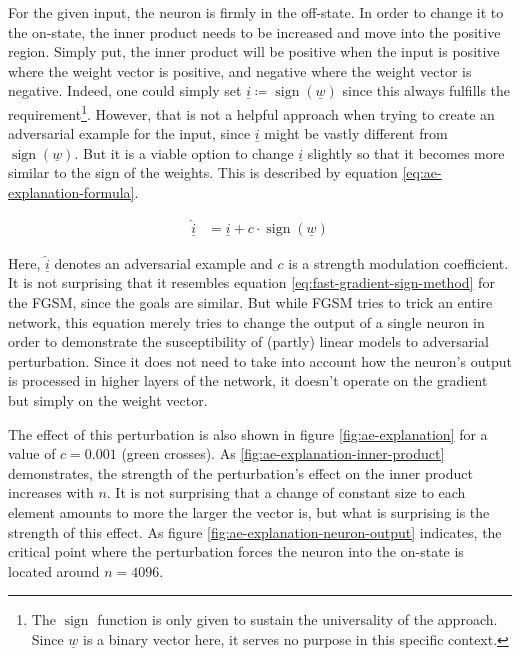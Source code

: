 \documentclass[11pt, a4paper]{article}
\newcommand\braces[1]{\left(#1\right)}
\renewcommand{\vec}[1]{\underline{#1}}
\DeclareMathOperator{\sign}{sign}
\begin{document}

For the given input, the neuron is firmly in the off-state. In order to change it to the on-state, the inner product needs to be increased and move into the positive region. Simply put, the inner product will be positive when the input is positive where the weight vector is positive, and negative where the weight vector is negative. Indeed, one could simply set $\vec{i} \coloneqq \sign \braces{\vec{w}}$ since this always fulfills the requirement\footnote{The $\sign$ function is only given to sustain the universality of the approach. Since $\vec{w}$ is a binary vector here, it serves no purpose in this specific context.}. However, that is not a helpful approach when trying to create an adversarial example for the input, since $\vec{i}$ might be vastly different from $\sign \braces{\vec{w}}$. But it is a viable option to change $\vec{i}$ slightly so that it becomes more similar to the sign of the weights. This is described by equation \eqref{eq:ae-explanation-formula}.

\begin{align}
	\vec{\hat i}&= \vec{i} + c \cdot \sign \braces{\vec{w}} \label{eq:ae-explanation-formula}
\end{align}

Here, $\vec{\hat i}$ denotes an adversarial example and $c$ is a strength modulation coefficient. It is not surprising that it resembles equation \eqref{eq:fast-gradient-sign-method} for the FGSM, since the goals are similar. But while FGSM tries to trick an entire network, this equation merely tries to change the output of a single neuron in order to demonstrate the susceptibility of (partly) linear models to adversarial perturbation. Since it does not need to take into account how the neuron's output is processed in higher layers of the network, it doesn't operate on the gradient but simply on the weight vector.

The effect of this perturbation is also shown in figure \ref{fig:ae-explanation} for a value of $c = 0.001$ (green crosses). As \ref{fig:ae-explanation-inner-product} demonstrates, the strength of the perturbation's effect on the inner product increases with $n$. It is not surprising that a change of constant size to each element amounts to more the larger the vector is, but what is surprising is the strength of this effect. As figure \ref{fig:ae-explanation-neuron-output} indicates, the critical point where the perturbation forces the neuron into the on-state is located around $n = 4096$.
\end{document}
